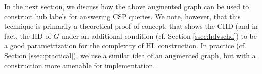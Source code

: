 In the next section, we discuss how the above augmented graph can be used to construct hub labels for answering CSP queries. 
We note, however, that this technique is primarily a theoretical proof-of-concept, that shows the CHD (and in fact, the HD of $G$ under an additional condition (cf. Section \ref{ssec:hdvschd}) to be a good parametrization for the complexity of HL construction.
In practice (cf. Section \ref{ssec:practical}), we use a similar idea of an augmented graph, but with a construction more amenable for implementation.
